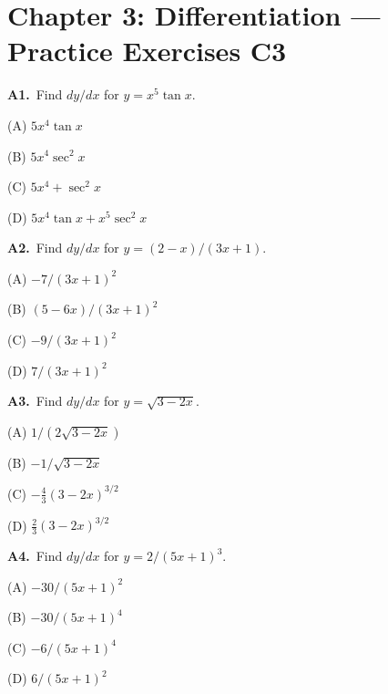 \documentclass[11pt]{article}
\begin{document}
\section*{Chapter 3: Differentiation --- Practice Exercises C3}

\bigskip\noindent\textbf{A1.}\ Find $dy/dx$ for $y=x^5\tan x$.
\begin{list}{}{\setlength{\leftmargin}{3em}\setlength{\labelwidth}{2.5em}\setlength{\itemsep}{0pt}\setlength{\topsep}{2pt}}
\item[(A)] $5x^4\tan x$
\item[(B)] $5x^4\sec^2x$
\item[(C)] $5x^4+\sec^2x$
\item[(D)] $5x^4\tan x+x^5\sec^2x$
\end{list}

\bigskip\noindent\textbf{A2.}\ Find $dy/dx$ for $y=(2-x)/(3x+1)$.
\begin{list}{}{\setlength{\leftmargin}{3em}\setlength{\labelwidth}{2.5em}\setlength{\itemsep}{0pt}\setlength{\topsep}{2pt}}
\item[(A)] $-7/(3x+1)^2$
\item[(B)] $(5-6x)/(3x+1)^2$
\item[(C)] $-9/(3x+1)^2$
\item[(D)] $7/(3x+1)^2$
\end{list}

\bigskip\noindent\textbf{A3.}\ Find $dy/dx$ for $y=\sqrt{3-2x}$.
\begin{list}{}{\setlength{\leftmargin}{3em}\setlength{\labelwidth}{2.5em}\setlength{\itemsep}{0pt}\setlength{\topsep}{2pt}}
\item[(A)] $1/(2\sqrt{3-2x})$
\item[(B)] $-1/\sqrt{3-2x}$
\item[(C)] $-\frac43(3-2x)^{3/2}$
\item[(D)] $\frac23(3-2x)^{3/2}$
\end{list}

\bigskip\noindent\textbf{A4.}\ Find $dy/dx$ for $y=2/(5x+1)^3$.
\begin{list}{}{\setlength{\leftmargin}{3em}\setlength{\labelwidth}{2.5em}\setlength{\itemsep}{0pt}\setlength{\topsep}{2pt}}
\item[(A)] $-30/(5x+1)^2$
\item[(B)] $-30/(5x+1)^4$
\item[(C)] $-6/(5x+1)^4$
\item[(D)] $6/(5x+1)^2$
\end{list}
\end{document}
